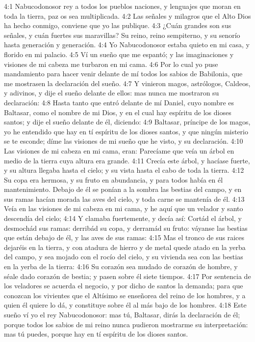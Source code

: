 4:1 Nabucodonosor rey a todos los pueblos naciones, y lenguajes que moran en toda la tierra, paz os sea multiplicada.
4:2 Las señales y milagros que el Alto Dios ha hecho conmigo, conviene que yo las publique.
4:3 ¿Cuán grandes son sus señales, y cuán fuertes sus maravillas? Su reino, reino sempiterno, y su senorío hasta generación y generación.
4:4 Yo Nabucodonosor estaba quieto en mi casa, y florido en mi palacio.
4:5 Ví un sueño que me espantó; y las imaginaciones y visiones de mi cabeza me turbaron en mi cama.
4:6 Por lo cual yo puse mandamiento para hacer venir delante de mí todos los sabios de Babilonia, que me mostrasen la declaración del sueño.
4:7 Y vinieron magos, astrólogos, Caldeos, y adivinos, y dije el sueño delante de ellos: mas nunca me mostraron su declaración:
4:8 Hasta tanto que entró delante de mí Daniel, cuyo nombre es Baltasar, como el nombre de mi Dios, y en el cual hay espíritu de los dioses santos; y dije el sueño delante de él, diciendo:
4:9 Baltasar, príncipe de los magos, yo he entendido que hay en tí espíritu de los dioses santos, y que ningún misterio se te esconde; díme las visiones de mi sueño que he visto, y su declaración.
4:10 Las visiones de mi cabeza en mi cama, eran: Parecíame que veía un árbol en medio de la tierra cuya altura era grande.
4:11 Crecía este árbol, y hacíase fuerte, y su altura llegaba hasta el cielo; y su vista hasta el cabo de toda la tierra.
4:12 Su copa era hermosa, y su fruto en abundancia, y para todos había en él mantenimiento. Debajo de él se ponían a la sombra las bestias del campo, y en sus ramas hacían morada las aves del cielo, y toda carne se mantenía de él.
4:13 Veía en las visiones de mi cabeza en mi cama, y he aquí que un velador y santo descendía del cielo;
4:14 Y clamaba fuertemente, y decía así: Cortád el árbol, y desmochád sus ramas: derribád su copa, y derramád su fruto: váyanse las bestias que están debajo de él, y las aves de sus ramas:
4:15 Mas el tronco de sus raices dejaréis en la tierra, y con atadura de hierro y de metal quede atado en la yerba del campo, y sea mojado con el rocío del cielo, y su vivienda sea con las bestias en la yerba de la tierra:
4:16 Su corazón sea mudado de corazón de hombre, y séale dado corazón de bestia; y pasen sobre él siete tiempos.
4:17 Por sentencia de los veladores se acuerda el negocio, y por dicho de santos la demanda; para que conozcan los vivientes que el Altísimo se enseñorea del reino de los hombres, y a quien él quiere lo dá, y constituye sobre él al más bajo de los hombres.
4:18 Este sueño ví yo el rey Nabucodonosor: mas tú, Baltasar, dirás la declaración de él; porque todos los sabios de mi reino nunca pudieron mostrarme su interpretación: mas tú puedes, porque hay en tí espíritu de los dioses santos.
